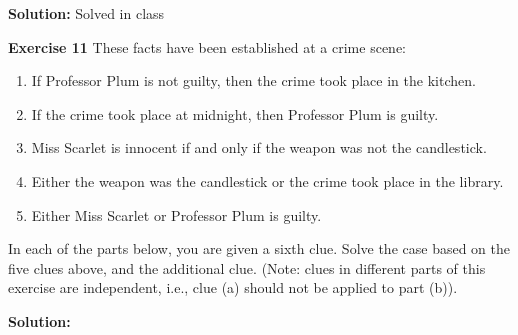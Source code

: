 \documentclass[12pt,oneside]{exam}
\newenvironment{exercise}[1]{\vspace{.1in}\noindent\textbf{Exercise #1 \hspace{.05em}}}{}
\newenvironment{newsolution}{\vspace{.1in}\noindent\textbf{Solution: \hspace{.05em}}}{}
\begin{document}
\begin{newsolution}
Solved in class
\end{newsolution}

\begin{exercise}{11}
These facts have been established at a crime scene:
\begin{enumerate}
\item If Professor Plum is not guilty, then the crime took place in the kitchen.
\item If the crime took place at midnight, then Professor Plum is guilty.
\item Miss Scarlet is innocent if and only if the weapon was not the candlestick.
\item Either the weapon was the candlestick or the crime took place in the library.
\item Either Miss Scarlet or Professor Plum is guilty.
\end{enumerate}

In each of the parts below, you are given a sixth clue. Solve the case based on the five clues above, and the additional clue. (Note: clues in different parts of this exercise are independent, i.e., clue (a) should not be applied to part (b)). 

\end{exercise}

\begin{newsolution}
\end{newsolution}
\end{document}

